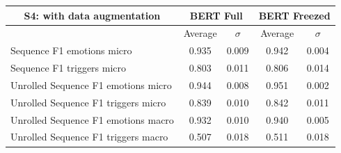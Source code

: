 \documentclass[11pt,table,xcdraw]{article}
\begin{document}
\begin{table}[h]
\bigskip
\begin{tabular}{|l|cc|cc|}
\hline
\multicolumn{1}{|c|}{\textbf{S4: with data augmentation}}              & \multicolumn{2}{c|}{BERT Full}                                                     & \multicolumn{2}{c|}{BERT Freezed}                                                  \\ \hline
\multicolumn{1}{|c|}{}              & \multicolumn{1}{c|}{Average}                       & $\sigma$                         & \multicolumn{1}{c|}{Average}                       & $\sigma$                         \\ \hline
Sequence F1 emotions micro          & \multicolumn{1}{c|}{\cellcolor[HTML]{009901}0.935} & \cellcolor[HTML]{FFFFFF}0.009 & \multicolumn{1}{c|}{\cellcolor[HTML]{009901}0.942} & \cellcolor[HTML]{FFFFFF}0.004 \\ \hline
Sequence F1 triggers micro          & \multicolumn{1}{c|}{\cellcolor[HTML]{32CB00}0.803} & \cellcolor[HTML]{FFFFFF}0.011 & \multicolumn{1}{c|}{\cellcolor[HTML]{32CB00}0.806} & \cellcolor[HTML]{FFFFFF}0.014 \\ \hline
Unrolled Sequence F1 emotions micro & \multicolumn{1}{c|}{\cellcolor[HTML]{009901}0.944} & \cellcolor[HTML]{FFFFFF}0.008 & \multicolumn{1}{c|}{\cellcolor[HTML]{009901}0.951}  & \cellcolor[HTML]{FFFFFF}0.002 \\ \hline
Unrolled Sequence F1 triggers micro & \multicolumn{1}{c|}{\cellcolor[HTML]{32CB00}0.839} & \cellcolor[HTML]{FFFFFF}0.010 & \multicolumn{1}{c|}{\cellcolor[HTML]{32CB00}0.842} & \cellcolor[HTML]{FFFFFF}0.011 \\ \hline
Unrolled Sequence F1 emotions macro & \multicolumn{1}{c|}{\cellcolor[HTML]{009901}0.932} & \cellcolor[HTML]{FFFFFF}0.010 & \multicolumn{1}{c|}{\cellcolor[HTML]{009901}0.940} & \cellcolor[HTML]{FFFFFF}0.005 \\ \hline
Unrolled Sequence F1 triggers macro & \multicolumn{1}{c|}{\cellcolor[HTML]{F8A102}0.507} & \cellcolor[HTML]{FFFFFF}0.018 & \multicolumn{1}{c|}{\cellcolor[HTML]{F8A102}0.511} & \cellcolor[HTML]{FFFFFF}0.018 \\ \hline
\end{tabular}
\end{table}
\end{document}
